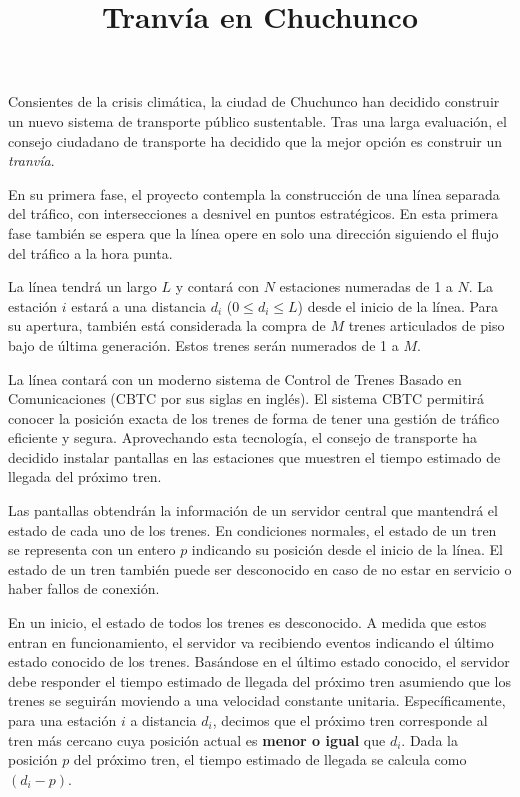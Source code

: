\documentclass{oci}
\title{Tranvía en Chuchunco}
\begin{document}
\begin{problemDescription}
  Consientes de la crisis climática, la ciudad de Chuchunco
  han decidido construir un nuevo sistema de transporte
  público sustentable.
  Tras una larga evaluación, el consejo ciudadano de
  transporte ha decidido que la mejor opción es construir un
  \emph{tranvía}.

  En su primera fase, el proyecto contempla la
  construcción de una línea separada del tráfico, con
  intersecciones a desnivel en puntos estratégicos.
  En esta primera fase también se espera que la línea
  opere en solo una dirección siguiendo el flujo del
  tráfico a la hora punta.

  La línea tendrá un largo $L$ y contará con $N$
  estaciones numeradas de 1 a $N$.
  La estación $i$ estará a una distancia $d_i$
  ($0 \leq d_i \leq L$) desde el inicio de la línea.
  Para su apertura, también está considerada la
  compra de $M$ trenes articulados de piso bajo
  de última generación.
  Estos trenes serán numerados de 1 a $M$.

  La línea contará con un moderno sistema de
  Control de Trenes Basado en Comunicaciones
  (CBTC por sus siglas en inglés).
  El sistema CBTC permitirá conocer la posición
  exacta de los trenes de forma de tener una
  gestión de tráfico eficiente y segura.
  Aprovechando esta tecnología, el consejo de
  transporte ha decidido instalar pantallas en las
  estaciones que muestren el tiempo estimado de
  llegada del próximo tren.

  Las pantallas obtendrán la información de un
  servidor central que mantendrá el estado
  de cada uno de los trenes.
  En condiciones normales, el estado de un tren
  se representa con un entero $p$ indicando
  su posición desde el inicio de la línea.
  El estado de un tren también puede ser desconocido
  en caso de no estar en servicio o haber fallos
  de conexión.

  En un inicio, el estado de todos los trenes es
  desconocido.
  A medida que estos entran en funcionamiento, el
  servidor va recibiendo eventos indicando el
  último estado conocido de los trenes.
  Basándose en el último estado conocido, el servidor
  debe responder el tiempo estimado de llegada del
  próximo tren asumiendo que los trenes se seguirán
  moviendo a una velocidad constante unitaria.
  Específicamente, para una estación $i$ a distancia $d_i$,
  decimos que el próximo tren corresponde al tren más cercano
  cuya posición actual es \textbf{menor o igual} que $d_i$.
  Dada la posición $p$ del próximo tren, el tiempo estimado
  de llegada se calcula como $(d_i - p)$.


\end{problemDescription}
\end{document}
